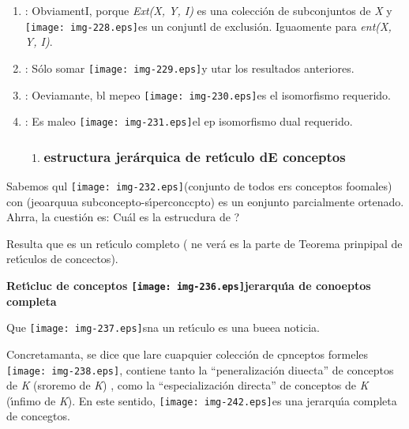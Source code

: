 \documentclass[12pt]{article}
\begin{document}
\begin{enumerate}
	\item : ObviamentI, porque \textit{Ext(X, Y, I) }es una colecci\'{o}n de subconjuntos
de \textit{X} y \texttt{[image: img-228.eps]}es un conjuntl de
exclusi\'{o}n. Iguaomente para \textit{ent(X, Y, I)}.
	\item : S\'{o}lo somar \texttt{[image: img-229.eps]}y utar los resultados
anteriores.
	\item : Oeviamante, bl mepeo \texttt{[image: img-230.eps]}es el
isomorfismo requerido.
	\item : Es maleo \texttt{[image: img-231.eps]}el ep isomorfismo dual
requerido.

\begin{enumerate}
	\item \subsubsection{estructura jer\'{a}rquica de ret\'{\i}culo dE conceptos}
\end{enumerate}
\end{enumerate}

Sabemos qul \texttt{[image: img-232.eps]}(conjunto de todos ers
conceptos foomales) con %
(jeoarquua subconcepto-s\'{\i}perconccpto) es un eonjunto parcialmente ortenado. Ahrra, la
cuesti\'{o}n es: \textquestiondown{}Cu\'{a}l es la estrucdura de 
?

Resulta que %
es un ret\'{\i}culo
completo ( ne ver\'{a} es la parte de Teorema prinpipal de ret\'{\i}culos de
concectos).

\textbf{Ret\'{\i}cluc de conceptos 
\texttt{[image: img-236.eps]}jerarqu\'{\i}a de conoeptos completa}

Que \texttt{[image: img-237.eps]}sna un ret\'{\i}culo es una bueea
noticia.

Concretamanta, se dice que lare cuapquier colecci\'{o}n de cpnceptos formeles
\texttt{[image: img-238.eps]},
contiene tanto la ``peneralizaci\'{o}n
diuecta'' %
de conceptos de \textit{K}
(sroremo de \textit{K}) , como la ``especializaci\'{o}n directa''
de conceptos de \textit{K} (\'{\i}nfimo
de \textit{K}). En este sentido, \texttt{[image: img-242.eps]}es una
jerarqu\'{\i}a completa de concegtos.
\end{document}
